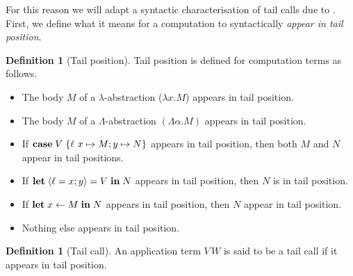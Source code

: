 \documentclass[12pt,phd,lfcs,twoside,openright,logo,leftchapter,normalheadings]{infthesis}
\theoremstyle{plain}
\theoremstyle{definition}
\newtheorem{definition}[theorem]{Definition}
\begin{document}
For this reason we will adapt a syntactic characterisation of tail
calls due to \citet{Clinger98}. First, we define what it means for a
computation to syntactically \emph{appear in tail position}.
%
\begin{definition}[Tail position]\label{def:tail-comp}
  Tail position is defined for computation terms as follows.
  \begin{itemize}
    \item The body $M$ of a $\lambda$-abstraction ($\lambda x. M$) appears in
      tail position.
    \item The body $M$ of a $\Lambda$-abstraction $(\Lambda \alpha.M)$
      appears in tail position.
    \item If $\mathbf{case}\;V\;\{\ell~x \mapsto M; y \mapsto N\}$ appears in tail
      position, then both $M$ and $N$ appear in tail positions.
    \item If $\mathbf{let}\;\langle \ell = x; y \rangle = V \;\mathbf{in}\;N$ appears in tail
      position, then $N$ is in tail position.
    \item If $\mathbf{let}\;x \leftarrow M\;\mathbf{in}\;N$ appears in tail position, then
      $N$ appear in tail position.
    \item Nothing else appears in tail position.
  \end{itemize}
\end{definition}
%
\begin{definition}[Tail call]\label{def:tail-call}
  An application term $V\,W$ is said to be a tail call if it appears
  in tail position.
\end{definition}
%
%
\end{document}
